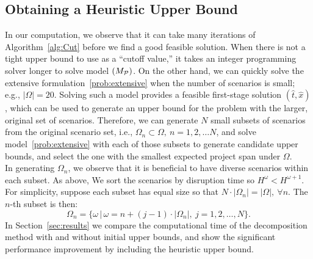 \documentclass[11pt]{article}
\newcommand{\cP}{{\cal P}}
\begin{document}
	\subsection{Obtaining a Heuristic Upper Bound} \label{subsec:HUB}
	In our computation, we observe that it can take many iterations of Algorithm~\ref{alg:Cut} before we find a good feasible solution. When there is not a tight upper bound to use as a ``cutoff value,'' it takes an integer programming solver longer to solve model \((M_{\cP})\). On the other hand, we can quickly solve the extensive formulation~\eqref{prob:extensive} when the number of scenarios is small; e.g., \(|\Omega| = 20\). Solving such a model provides a feasible first-stage solution \((\hat{t},\hat{x})\), which can be used to generate an upper bound for the problem with the larger, original set of scenarios. Therefore, we can generate \(N\) small subsets of scenarios from the original scenario set, i.e., \(\Omega_n \subset \Omega,\ n = 1,2,\dots N\), and solve model~\eqref{prob:extensive} with each of those subsets to generate candidate upper bounds, and select the one with the smallest expected project span under $\Omega$. \\
	\newline
	In generating \(\Omega_n\), we observe that it is beneficial to have diverse scenarios within each subset.
	As above, We sort the scenarios by disruption time so $H^\omega < H^{\omega+1}$. For simplicity, suppose each subset has equal size so that \(N \cdot |\Omega_n| = |\Omega|, \ \forall n\). The \(n\)-th subset is then:
	\[\Omega_n = \{ \omega \, | \, \omega=n + (j - 1) \cdot |\Omega_n|,\ j = 1,2,\dots, N\}.\]
	In Section~\ref{sec:results} we compare the computational time of the decomposition method with and without initial upper bounds, and show the significant performance improvement by including the heuristic upper bound.
	
\end{document}
